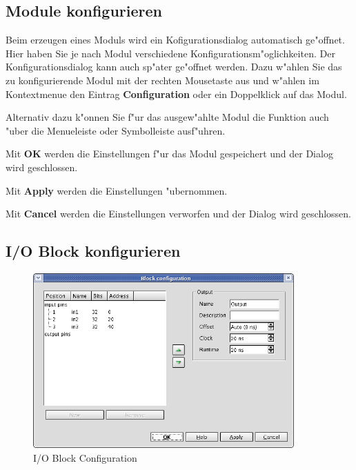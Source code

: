 \documentclass[a4paper,titlepage,12pt,ngerman]{scrbook}
\begin{document}
\subsection{Module konfigurieren}
Beim erzeugen eines Moduls wird ein Kofigurationsdialog automatisch ge"offnet. Hier haben Sie je nach Modul verschiedene Konfigurationsm"oglichkeiten. Der Konfigurationsdialog kann auch sp"ater ge"offnet werden. Dazu w"ahlen Sie das zu konfigurierende Modul mit der rechten Mousetaste aus und w"ahlen im Kontextmenue den Eintrag {\bf Configuration} oder ein Doppelklick auf das Modul.\par
Alternativ dazu k"onnen Sie f"ur das ausgew"ahlte Modul die Funktion auch "uber die Menueleiste oder Symbolleiste ausf"uhren. \par
\par
Mit {\bf OK} werden die Einstellungen f"ur das Modul gespeichert und der Dialog wird geschlossen.\par
Mit {\bf Apply} werden die Einstellungen "ubernommen.\par
Mit {\bf Cancel} werden die Einstellungen verworfen und der Dialog wird geschlossen.\par 



\subsection{I/O Block konfigurieren}
\begin{figure}[htbp]

\begin{center}

\includegraphics[width=10cm]{OutputBlockConfiguration}

\caption{I/O Block Configuration}\label{test}

\end{center}

\end{figure}
\end{document}
